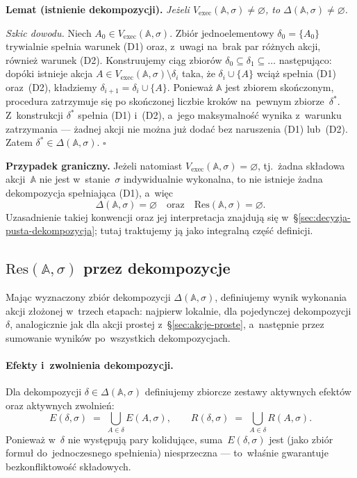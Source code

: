 \documentclass[11pt,a4paper]{article}
\theoremstyle{definition}
\begin{document}
\medskip
\noindent \textbf{Lemat (istnienie dekompozycji).}
\emph{Jeżeli $V_{\mathrm{exec}}(\mathbb{A},\sigma) \neq \varnothing$, to
$\Delta(\mathbb{A},\sigma) \neq \varnothing$.}

\medskip
\noindent \textit{Szkic dowodu.}
Niech $A_0 \in V_{\mathrm{exec}}(\mathbb{A},\sigma)$. Zbiór jednoelementowy
$\delta_0 = \{A_0\}$ trywialnie spełnia warunek (D1) oraz, z~uwagi na~brak
par różnych akcji, również warunek (D2). Konstruujemy ciąg zbiorów
$\delta_0 \subseteq \delta_1 \subseteq \ldots$ następująco: dopóki
istnieje akcja $A \in V_{\mathrm{exec}}(\mathbb{A},\sigma) \setminus \delta_i$
taka, że $\delta_i \cup \{A\}$ wciąż spełnia (D1) oraz~(D2), kładziemy
$\delta_{i+1} = \delta_i \cup \{A\}$. Ponieważ $\mathbb{A}$ jest zbiorem
skończonym, procedura zatrzymuje się po skończonej liczbie kroków
na~pewnym zbiorze~$\delta^\ast$. Z~konstrukcji $\delta^\ast$ spełnia
(D1) i~(D2), a~jego maksymalność wynika z~warunku zatrzymania ---
żadnej akcji nie można już dodać bez naruszenia (D1) lub~(D2). Zatem
$\delta^\ast \in \Delta(\mathbb{A},\sigma)$. \hfill$\square$

\medskip
\noindent \textbf{Przypadek graniczny.}
Jeżeli natomiast $V_{\mathrm{exec}}(\mathbb{A},\sigma) = \varnothing$,
tj.\ żadna składowa akcji~$\mathbb{A}$ nie jest w~stanie~$\sigma$
indywidualnie wykonalna, to nie istnieje żadna dekompozycja spełniająca
(D1), a~więc
\[
  \Delta(\mathbb{A},\sigma) = \varnothing
  \quad\text{oraz}\quad
  \mathrm{Res}(\mathbb{A},\sigma) = \varnothing.
\]
Uzasadnienie takiej konwencji oraz jej interpretacja znajdują się
w~§\ref{sec:decyzja-pusta-dekompozycja}; tutaj traktujemy ją jako integralną część definicji.

\subsection{\texorpdfstring{$\mathrm{Res}(\mathbb{A}, \sigma)$}{Res(A,sigma)} przez dekompozycje}
\label{sec:res-zlozone}

Mając wyznaczony zbiór dekompozycji $\Delta(\mathbb{A},\sigma)$,
definiujemy wynik wykonania akcji złożonej w~trzech etapach: najpierw
lokalnie, dla pojedynczej dekompozycji $\delta$, analogicznie jak dla
akcji prostej z~§\ref{sec:akcje-proste}, a~następnie przez sumowanie wyników po~wszystkich
dekompozycjach.

\paragraph{Efekty i~zwolnienia dekompozycji.}
Dla dekompozycji $\delta \in \Delta(\mathbb{A},\sigma)$ definiujemy
zbiorcze zestawy aktywnych efektów oraz aktywnych zwolnień:
\[
  E(\delta,\sigma) \;=\; \bigcup_{A \in \delta} E(A,\sigma),
  \qquad
  R(\delta,\sigma) \;=\; \bigcup_{A \in \delta} R(A,\sigma).
\]
Ponieważ w~$\delta$ nie występują pary kolidujące, suma~$E(\delta,\sigma)$
jest (jako zbiór formuł do~jednoczesnego spełnienia) niesprzeczna ---
to~właśnie gwarantuje bezkonfliktowość składowych.
\end{document}
